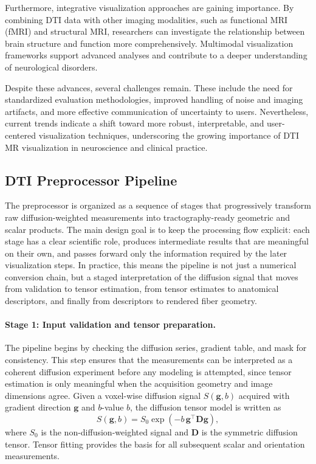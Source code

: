 Furthermore, integrative visualization approaches are gaining importance. By combining DTI data with other imaging modalities, such as functional MRI (fMRI) and structural MRI, researchers can investigate the relationship between brain structure and function more comprehensively. Multimodal visualization frameworks support advanced analyses and contribute to a deeper understanding of neurological disorders.

Despite these advances, several challenges remain. These include the need for standardized evaluation methodologies, improved handling of noise and imaging artifacts, and more effective communication of uncertainty to users. Nevertheless, current trends indicate a shift toward more robust, interpretable, and user-centered visualization techniques, underscoring the growing importance of DTI MR visualization in neuroscience and clinical practice.

\subsection{DTI Preprocessor Pipeline}
The preprocessor is organized as a sequence of stages that progressively transform raw diffusion-weighted measurements into tractography-ready geometric and scalar products. The main design goal is to keep the processing flow explicit: each stage has a clear scientific role, produces intermediate results that are meaningful on their own, and passes forward only the information required by the later visualization steps. In practice, this means the pipeline is not just a numerical conversion chain, but a staged interpretation of the diffusion signal that moves from validation to tensor estimation, from tensor estimates to anatomical descriptors, and finally from descriptors to rendered fiber geometry.

\paragraph{Stage 1: Input validation and tensor preparation.}
The pipeline begins by checking the diffusion series, gradient table, and mask for consistency. This step ensures that the measurements can be interpreted as a coherent diffusion experiment before any modeling is attempted, since tensor estimation is only meaningful when the acquisition geometry and image dimensions agree. Given a voxel-wise diffusion signal $S(\mathbf{g}, b)$ acquired with gradient direction $\mathbf{g}$ and $b$-value $b$, the diffusion tensor model is written as
\begin{equation}
S(\mathbf{g}, b) = S_0 \exp\!\left(-b\, \mathbf{g}^\top \mathbf{D} \mathbf{g}\right),
\end{equation}
where $S_0$ is the non-diffusion-weighted signal and $\mathbf{D}$ is the symmetric diffusion tensor. Tensor fitting provides the basis for all subsequent scalar and orientation measurements.

